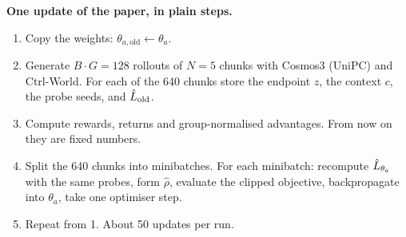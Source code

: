 \begin{paperlink}
\textbf{One update of the paper, in plain steps.}
\begin{enumerate}[leftmargin=*]
\item Copy the weights: $\theta_{a,\mathrm{old}}\leftarrow\theta_a$.
\item Generate $B\cdot G=128$ rollouts of $N=5$ chunks with Cosmos3 (UniPC) and Ctrl-World. For each of the 640 chunks store the endpoint $z$, the context $c$, the probe seeds, and $\hat L_{\mathrm{old}}$.
\item Compute rewards, returns and group-normalised advantages. From now on they are fixed numbers.
\item Split the 640 chunks into minibatches. For each minibatch: recompute $\hat L_{\theta_a}$ with the same probes, form $\hat\rho$, evaluate the clipped objective, backpropagate into $\theta_a$, take one optimiser step.
\item Repeat from 1. About 50 updates per run.
\end{enumerate}
\end{paperlink}

